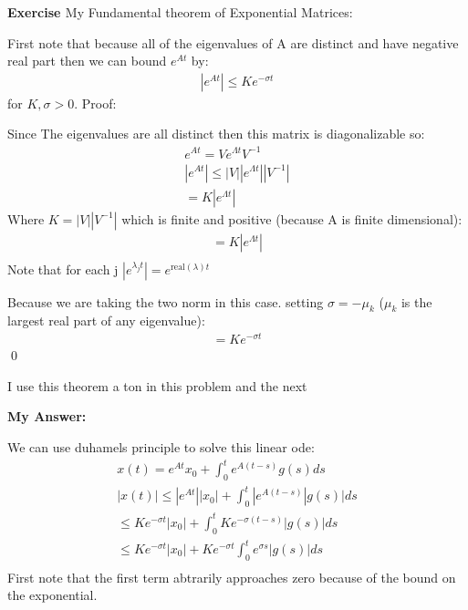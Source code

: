 \documentclass[12pt]{article}
\newenvironment{exercise}[1]{\vspace{.1in}\noindent\textbf{Exercise #1 \hspace{.05em}}}{}
\theoremstyle{definition}
\theoremstyle{remark}
\begin{document}
\begin{exercise}{3.3}

	\textbf{My Fundamental theorem of Exponential Matrices:}

	First note that because all of the eigenvalues of A are distinct and have negative real part then we can bound $e^{At}$ by:
	\begin{align}
		|e^{At}|\leq Ke^{-\sigma t}
	\end{align}
	for $K,\sigma >0$. Proof:

	Since The eigenvalues are all distinct then this matrix is diagonalizable so:
	\begin{align}
		e^{At}=Ve^{\Lambda t}V^{-1}            \\
		|e^{At}|\leq|V||e^{\Lambda t}||V^{-1}| \\
		=K|e^{\Lambda t}|
	\end{align}
	Where $K= |V||V^{-1}|$ which is finite and positive (because A is finite dimensional):
	\begin{align}
		=K|e^{\Lambda t}| \\
	\end{align}
	Note that for each j $|e^{\lambda_j t}|= e^{\text{real}(\lambda) t}$

	Because we are taking the two norm in this case. setting $\sigma = -\mu_k$ ($\mu_k$ is the largest real part of any eigenvalue):
	\begin{align}
		=Ke^{-\sigma t}
	\end{align} \qed

	I use this theorem a ton in this problem and the next

	\textbf{My Answer:}

	We can use duhamels principle to solve this linear ode:
	\begin{align}
		x(t)=e^{At}x_0+\int_0^te^{A(t-s)}g(s)ds                              \\
		|x(t)|\leq |e^{At}||x_0|+\int_0^t |e^{A(t-s)}|g(s)|ds                \\
		\leq Ke^{-\sigma t}|x_0|+\int_0^t Ke^{-\sigma(t-s)}|g(s)|ds          \\
		\leq Ke^{-\sigma t}|x_0|+Ke^{-\sigma t}\int_0^t e^{\sigma s}|g(s)|ds \\
	\end{align}
	First note that the first term abtrarily approaches zero because of the bound on the exponential.


\end{exercise}
\end{document}
